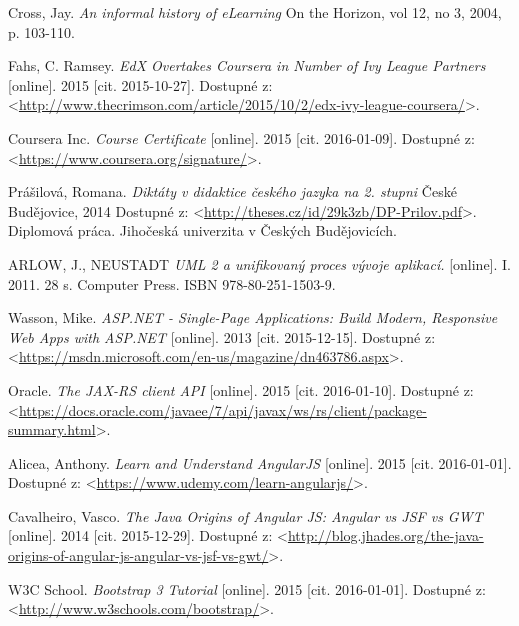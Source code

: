\documentclass[12pt,oneside]{fithesis2}
\begin{document}
\begin{thebibliography}{59}
    
    
  		Cross, Jay.
  		\emph{An informal history of eLearning}
  		On the Horizon, vol 12, no 3, 2004, p. 103-110.
    
    
  		Fahs, C. Ramsey.
  		\emph{EdX Overtakes Coursera in Number of Ivy League Partners}
  		[online].
  		2015
  		[cit. 2015-10-27].
  		Dostupné z: <\url{http://www.thecrimson.com/article/2015/10/2/edx-ivy-league-coursera/}>.

  		Coursera Inc.
  		\emph{Course Certificate}
  		[online].
  		2015
  		[cit. 2016-01-09].
  		Dostupné z: <\url{https://www.coursera.org/signature/}>.
  		
  		Prášilová, Romana.
  		\emph{Diktáty v didaktice českého jazyka na 2. stupni}
  		České Budějovice, 
  		2014
  		Dostupné z: <\url{http://theses.cz/id/29k3zb/DP-Prilov.pdf}>.
  		Diplomová práca. Jihočeská univerzita v Českých Budějovicích.
  		
  		
  		ARLOW, J., NEUSTADT
  		\emph{UML 2 a unifikovaný proces vývoje aplikací.}
  		[online].
  		I. 2011. 28 s.
		Computer Press. ISBN 978-80-251-1503-9. 
		
  		Wasson, Mike.
  		\emph{ASP.NET - Single-Page Applications: Build Modern, Responsive Web Apps with ASP.NET}
  		[online].
  		2013
  		[cit. 2015-12-15].
  		Dostupné z: <\url{https://msdn.microsoft.com/en-us/magazine/dn463786.aspx}>.	
  		
  		Oracle.
  		\emph{The JAX-RS client API}
  		[online].
  		2015
  		[cit. 2016-01-10].
  		Dostupné z: <\url{https://docs.oracle.com/javaee/7/api/javax/ws/rs/client/package-summary.html}>.	
  		
  		Alicea, Anthony.
  		\emph{Learn and Understand AngularJS}
  		[online].
  		2015
  		[cit. 2016-01-01].
  		Dostupné z: <\url{https://www.udemy.com/learn-angularjs/}>.
		
  		Cavalheiro, Vasco.
  		\emph{The Java Origins of Angular JS: Angular vs JSF vs GWT}
  		[online].
  		2014
  		[cit. 2015-12-29].
  		Dostupné z: <\url{http://blog.jhades.org/the-java-origins-of-angular-js-angular-vs-jsf-vs-gwt/}>.		
		
  		W3C School.
  		\emph{Bootstrap 3 Tutorial}
  		[online].
  		2015
  		[cit. 2016-01-01].
  		Dostupné z: <\url{http://www.w3schools.com/bootstrap/}>.		
		

\end{thebibliography}
\end{document}
